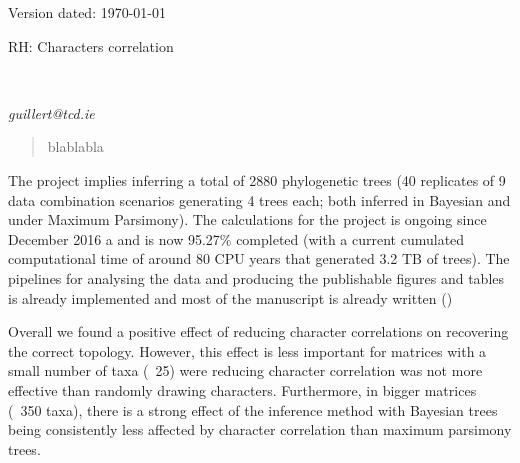 \documentclass[12pt,letterpaper]{article}
\begin{document}
\begin{flushright}
Version dated: \today
\end{flushright}
\bigskip
\noindent RH: Characters correlation

\bigskip
\medskip
\begin{center}

\bigskip

\\
\end{center}
\medskip
{} \textit{guillert@tcd.ie}\\ 
\vspace{1in}

\modulolinenumbers[1]
\linenumbers

%
%



\newpage
\begin{abstract}
blablabla
\end{abstract}

The project implies inferring a total of 2880 phylogenetic trees (40 replicates of 9 data combination scenarios generating 4 trees each; both inferred in Bayesian and under Maximum Parsimony).
The calculations for the project is ongoing since December 2016 a and is now 95.27\% completed (with a current cumulated computational time of around 80 CPU years that generated 3.2 TB of trees).
The pipelines for analysing the data and producing the publishable figures and tables is already implemented and most of the manuscript is already written ()

Overall we found a positive effect of reducing character correlations on recovering the correct topology.
However, this effect is less important for matrices with a small number of taxa (~25) were reducing character correlation was not more effective than randomly drawing characters.
Furthermore, in bigger matrices (~350 taxa), there is a strong effect of the inference method with Bayesian trees being consistently less affected by character correlation than maximum parsimony trees.
\end{document}
